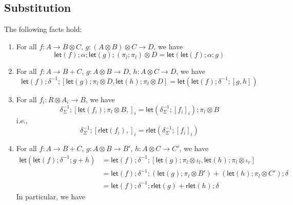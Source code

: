 \documentclass[acmsmall,screen,review]{acmart}
\newcommand{\ms}[1]{\ensuremath{\mathsf{#1}}}
\newcommand{\lmor}[1]{\ms{let}(#1)}
\newcommand{\rlmor}[1]{\ms{rlet}(#1)}
\begin{document}
\subsection{Substitution}

\begin{lemma}
  The following facts hold:
  \begin{enumerate}[label=(\alph*)]
    \item For all $f: A \to B \otimes C$, $g : (A \otimes B) \otimes C \to D$, we have
    \begin{equation}
      \lmor{f} ; \alpha ; \lmor{g} ; (\pi_l ; \pi_l) \otimes D =
      \lmor{\lmor{f} ; \alpha ; g}
    \end{equation}
    \item For all $f: A \to B + C$, $g : A \otimes B \to D$, $h : A \otimes C \to D$, we
    have
    \begin{equation}
      \lmor{f} ; \delta^{-1} ; [\lmor{g} ; \pi_l \otimes D, \lmor{h} ; \pi_l \otimes D]
      = \lmor{\lmor{f} ; \delta^{-1} ; [g, h]}
    \end{equation}
    \item For all $f_i : R \otimes A_i \to B$, we have
    \begin{equation}
      \delta_{\Sigma}^{-1} ; [\lmor{f_i} ; \pi_l \otimes B,]_i
      = \lmor{\delta_{\Sigma}^{-1} ; [f_i]_i} ; \pi_l \otimes B
    \end{equation}
    i.e.,
    \begin{equation}
      \delta_{\Sigma}^{-1} ; [\rlmor{f_i},]_i
      = \rlmor{\delta_{\Sigma}^{-1} ; [f_i]_i}
    \end{equation}
    \item For all $f : A \to B + C$, $g : A \otimes B \to B'$, $h : A \otimes C \to C'$, we have
    \begin{equation}
      \begin{aligned}
      \lmor{\lmor{f} ; \delta^{-1} ; g + h}
      &= \lmor{f} ; \delta^{-1} 
        ; [\lmor{g} ; \pi_l \otimes \iota_l, \lmor{h} ; \pi_l \otimes \iota_r] \\
      &= \lmor{f} ; \delta^{-1} 
        ; (\lmor{g} ; \pi_l \otimes B') + (\lmor{h} ; \pi_l \otimes C')
        ; \delta \\
      &= \lmor{f} ; \delta^{-1} 
      ; \rlmor{g} + \rlmor{h}
      ; \delta
      \end{aligned}
    \end{equation}
    In particular, we have
    \begin{equation}
      \begin{aligned}

\end{aligned}
\end{equation}
\end{enumerate}
\end{lemma}
\end{document}
